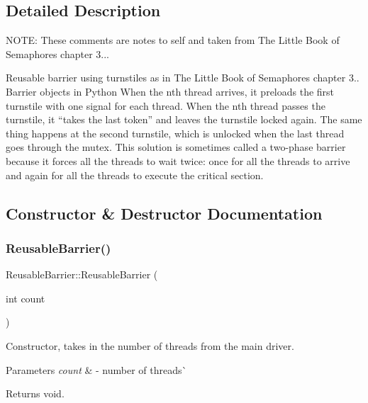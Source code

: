 \subsection{Detailed Description}
N\+O\+TE\+: These comments are notes to self and taken from The Little Book of Semaphores chapter 3... 

Reusable barrier using turnstiles as in The Little Book of Semaphores chapter 3.. Barrier objects in Python When the nth thread arrives, it preloads the first turnstile with one signal for each thread. When the nth thread passes the turnstile, it “takes the last token” and leaves the turnstile locked again. The same thing happens at the second turnstile, which is unlocked when the last thread goes through the mutex. This solution is sometimes called a two-\/phase barrier because it forces all the threads to wait twice\+: once for all the threads to arrive and again for all the threads to execute the critical section. 

\subsection{Constructor \& Destructor Documentation}
\mbox{\label{class_reusable_barrier_ae383e4b8c0407a21bbf47c6fccec6b15}} 
\subsubsection{\texorpdfstring{Reusable\+Barrier()}{ReusableBarrier()}}
{\footnotesize\ttfamily Reusable\+Barrier\+::\+Reusable\+Barrier (\begin{DoxyParamCaption}\item[{int}]{count }\end{DoxyParamCaption})}



Constructor, takes in the number of threads from the main driver. 


\begin{DoxyParams}{Parameters}
{\em count} & -\/ number of threads\`{} \\
\hline
\end{DoxyParams}
\begin{DoxyReturn}{Returns}
void. 
\end{DoxyReturn}


